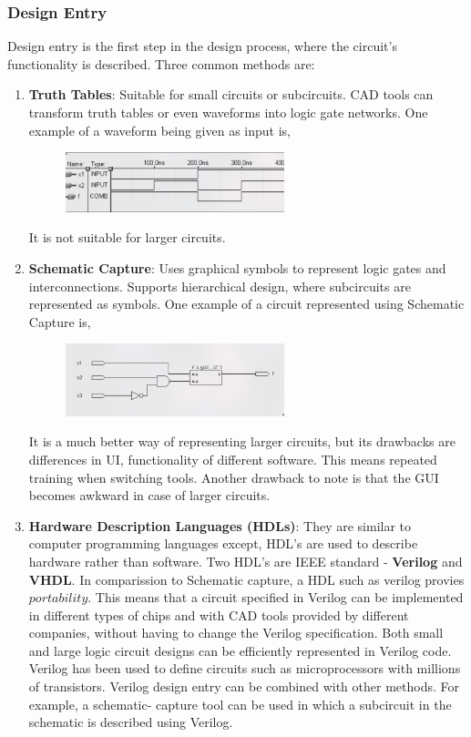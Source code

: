 \documentclass{article}
\begin{document}
      \subsubsection{Design Entry}
      Design entry is the first step in the design process, where the circuit's functionality is described. Three common methods are:
      \begin{enumerate}
        \item \textbf{Truth Tables}: Suitable for small circuits or subcircuits. CAD tools can transform truth tables or even waveforms into logic gate networks. One example of a waveform being given as input is,
          \begin{figure}[h!]
            \centering
            \includegraphics[width = 0.6\textwidth]{waveform.png}
            \label{stemplot}
          \end{figure}
          It is not suitable for larger circuits.
        \item \textbf{Schematic Capture}: Uses graphical symbols to represent logic gates and interconnections. Supports hierarchical design, where subcircuits are represented as symbols. One example of a circuit represented using Schematic Capture is,
          \begin{figure}[h!]
            \centering
            \includegraphics[width = 0.6\textwidth]{sc.png}
            \label{stemplot}
          \end{figure}
          It is a much better way of representing larger circuits, but its drawbacks are differences in UI, functionality of different software. This means repeated training when switching tools. Another drawback to note is that the GUI becomes awkward in case of larger circuits.
        \item \textbf{Hardware Description Languages (HDLs)}: They are similar to computer programming languages except, HDL's are used to describe hardware rather than software. Two HDL's are IEEE standard - \textbf{Verilog} and \textbf{VHDL}. In comparission to Schematic capture, a HDL such as verilog provies $portability$. This means that a circuit specified in Verilog can be implemented in different types of chips and with CAD tools provided by different companies, without having to change the Verilog specification. Both small and large logic circuit designs can be efficiently represented in Verilog code. Verilog has been used to define circuits such as microprocessors with millions of transistors. Verilog design entry can be combined with other methods. For example, a schematic-
          capture tool can be used in which a subcircuit in the schematic is described using Verilog.
      \end{enumerate}
\end{document}
